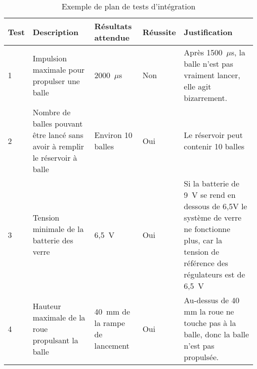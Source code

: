 \begin{table}[h!]
    \centering
    \begin{tabular}{p{0.25in}p{1.5in}p{1.5in}p{0.5in}p{1.5in}}
        \hline
        \bfseries Test & \bfseries Description & \bfseries Résultats attendue & \bfseries Réussite & \bfseries Justification \\
        \hline\hline
        1 & Impulsion maximale pour propulser une balle & 2000~$\mu$s & Non & Après 1500~$\mu$s, la balle n’est pas vraiment lancer, elle agit bizarrement. \\
        2 & Nombre de balles pouvant être lancé sans avoir à remplir le réservoir à balle & Environ 10 balles & Oui & Le réservoir peut contenir 10 balles \\
        3 & Tension minimale de la batterie des verre & 6,5~V & Oui & Si la batterie de 9~V se rend en dessous de 6,5V le système de verre ne fonctionne plus, car la tension de référence des régulateurs est de 6,5~V \\
        4 & Hauteur maximale de la roue propulsant la balle & 40~mm de la rampe de lancement & Oui & Au-dessus de 40 mm la roue ne touche pas à la balle, donc la balle n’est pas propulsée. \\
        \hline
    \end{tabular}
    \caption{Exemple de plan de tests d'intégration}
    \label{tab:s3-test-integration}
\end{table}

